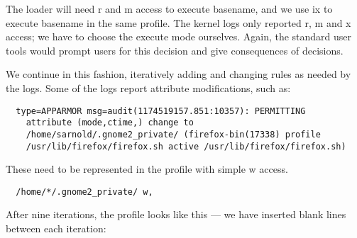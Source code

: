\documentclass[a4paper]{article}
\begin{document}
The loader will need r and m access to execute basename, and we use ix
to execute basename in the same profile. The kernel logs only reported
r, m and x access; we have to choose the execute mode ourselves.  Again,
the standard user tools would prompt users for this decision and give
consequences of decisions.

We continue in this fashion, iteratively adding and changing rules as
needed by the logs. Some of the logs report attribute modifications,
such as:

\begin{small}
\begin{verbatim}
  type=APPARMOR msg=audit(1174519157.851:10357): PERMITTING
    attribute (mode,ctime,) change to
    /home/sarnold/.gnome2_private/ (firefox-bin(17338) profile
    /usr/lib/firefox/firefox.sh active /usr/lib/firefox/firefox.sh)
\end{verbatim}
\end{small}

These need to be represented in the profile with simple w access.

\begin{small}
\begin{verbatim}
  /home/*/.gnome2_private/ w,
\end{verbatim}
\end{small}

After nine iterations, the profile looks like this --- we have inserted
blank lines between each iteration:
\end{document}
